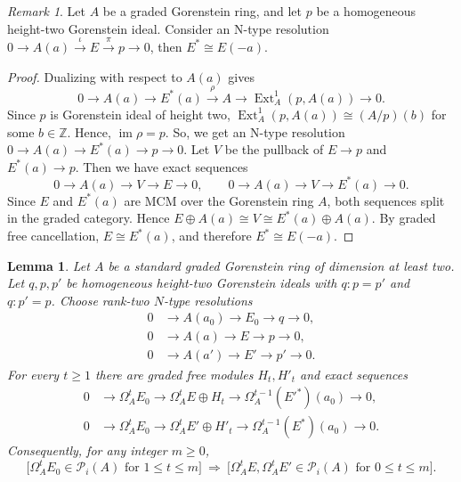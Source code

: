 \documentclass[11pt,letterpaper]{amsart}
\newcommand{\x}{\xrightarrow{}}
\DeclareMathOperator{\Ext}{Ext}
\theoremstyle{plain}
\newtheorem{lem}[thm]{Lemma}
\theoremstyle{definition}
\theoremstyle{remark}
\newtheorem{remark}[thm]{Remark}
\begin{document}
\begin{remark}
Let $A$ be a graded Gorenstein ring, and let $p$ be a homogeneous
height-two Gorenstein ideal. Consider an N-type resolution $0\x A(a)\xrightarrow{\iota}E
\xrightarrow{\pi}p\x 0$, then $E^*\cong E(-a)$.
\end{remark}
\begin{proof}
Dualizing with respect to $A(a)$ gives
\[
0\to A(a)\to E^*(a)\xrightarrow{\rho}A
\to\operatorname{Ext}_A^1(p,A(a))\to0.
\]
Since $p$ is Gorenstein ideal of height two,
$\Ext_A^1(p,A(a))\cong(A/p)(b)$
for some $b\in\mathbb Z$. Hence, $\operatorname{im}\rho=p$. So, we get an N-type resolution $0\x A(a)\x E^*(a)\x p\x 0$. Let $V$ be the pullback of $E\to p$ and $E^*(a)\to p$.
Then we have exact sequences
\[
0\to A(a)\to V\to E\to 0,
\qquad
0\to A(a)\to V\to E^*(a)\to 0.
\]
Since $E$ and $E^*(a)$ are MCM over the Gorenstein ring $A$,
both sequences split in the graded category. Hence $E\oplus A(a)\cong V\cong E^*(a)\oplus A(a)$. By graded free cancellation, $E\cong E^*(a)$,
and therefore $E^*\cong E(-a)$.
\end{proof}


\begin{lem}\label{lem:propagation}
Let $A$ be a standard graded Gorenstein ring  of dimension at least two.
Let $q,p,p'$ be homogeneous height-two Gorenstein ideals with
$q:p=p'$ and $q:p'=p$. Choose rank-two $N$-type resolutions
\begin{align*}
 0&\x A(a_0)\x E_0\x q\x0,\\
 0&\x A(a)\x E\x p\x0,\\
 0&\x A(a')\x E'\x p'\x0.
\end{align*}
For every $t\geq1$ there are graded free modules $H_t,H'_t$ and
exact sequences
\begin{align}
 0&\x\Omega_A^tE_0\x\Omega_A^tE\oplus H_t
 \x\Omega_A^{t-1}(E'^*)(a_0)\x0,
 \label{eq:prop1}\\
 0&\x\Omega_A^tE_0\x\Omega_A^tE'\oplus H'_t
 \x\Omega_A^{t-1}(E^*)(a_0)\x0.
 \label{eq:prop2}
\end{align}
Consequently, for any integer $m\geq0$,
\begin{equation}\label{eq:prop-conclusion}
 \bigl[\Omega_A^tE_0\in\mathcal{P}_{i}(A)\text{ for }1\leq t\leq m\bigr]
 \ \Longrightarrow\
 \bigl[\Omega_A^tE,\Omega_A^tE'\in\mathcal{P}_{i}(A)
       \text{ for }0\leq t\leq m\bigr].
\end{equation}
\end{lem}
\end{document}
